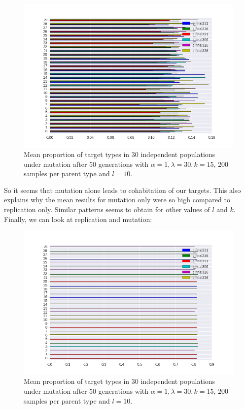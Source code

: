 \documentclass[a4paper]{article}
\begin{document}
\begin{figure}[h!]
  \centering
    \includegraphics[scale=.65]{../code-LOT-extension/plots/m-lam30-a1-k15-s200-l10-meFalse432-nomean.png}
  \caption{Mean proportion of target types in $30$ independent populations under mutation after $50$ generations with $\alpha = 1, \lambda = 30, k = 15$, $200$ samples per parent type and $l = 10$.}
\end{figure}

So it seems that mutation alone leads to cohabitation of our targets. This also explains why the mean results for mutation only were so high compared to replication only. Similar patterns seems to obtain for other values of $l$ and $k$. Finally, we can look at replication and mutation:
\newpage
\begin{figure}[h!]
  \centering
    \includegraphics[scale=0.65]{../code-LOT-extension/plots/rm-lam30-a1-k15-s200-l10-meFalse432-nomean.png}
  \caption{Mean proportion of target types in $30$ independent populations under mutation after $50$ generations with $\alpha = 1, \lambda = 30, k = 15$, $200$ samples per parent type and $l = 10$.}
\end{figure}
\end{document}
